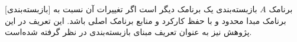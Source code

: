 [بازبسته‌بندی]
برنامک $A$ بازبسته‌بندی یک برنامک دیگر است اگر تغییرات آن نسبت به برنامک مبدا محدود و با حفظ کارکرد و منابع برنامک اصلی باشد.
این تعریف در این پژوهش نیز به عنوان تعریف مبنای بازبسته‌بندی در نظر گرفته شده‌است.






